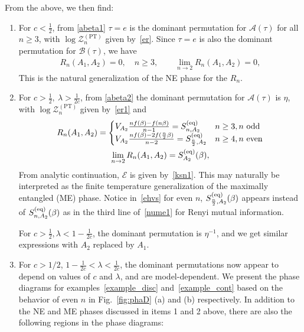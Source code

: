 \documentclass[a4paper,11pt]{article}
\newcommand\half{{\ensuremath{\frac{1}{2}}}}
\newcommand{\Zpt}{\sZ_n^{(\text{PT})}}
\newcommand{\be}{\begin{equation}}
\newcommand{\ee}{\end{equation}}
\def\b{{\beta}}
\newcommand\lam{\lambda}
\newcommand\ov{\over}
\newcommand\ha{{\half}}
\newcommand\sA{{\ensuremath{{\mathcal A}}}}
\newcommand\sB{{\ensuremath{{\mathcal B}}}}
\newcommand\sE{{\ensuremath{{\mathcal E}}}}
\newcommand\sZ{{\mathcal Z}}
\begin{document}
From the above, we then find: 
\begin{enumerate} 
\item For $c<\frac{1}{2}$, from \eqref{abeta1} $\tau=e$ is the dominant permutation for $\sA(\tau)$ for all $n\geq 3$, with $\log \Zpt$ given by~\eqref{er}. 
Since $\tau=e$ is also the dominant permutation for $\sB(\tau)$, we have 
\be\label{fin_un}
\begin{gathered} 
R_n(A_1, A_2) = 0, \quad n\geq 3, \quad \quad
\lim_{n\rightarrow 2} R_n(A_1, A_2) = 0, 
\end{gathered}
\ee
This is the natural generalization of the NE phase for the $R_n$. 

\item For $c>\ha, ~ \lambda>\frac{1}{2c}$, from \eqref{abeta2} the dominant permutation for $\sA(\tau)$ is $\eta$,
with $\log \Zpt$ given by~\eqref{er1} and
\begin{gather} 
\label{ehvs}
R_n(A_1, A_2) = \begin{cases} V_{A_2} \frac{n f(\beta)- f(n\beta)}{n-1} = S^{(\rm eq)}_{n, A_2} & n\geq 3, n \text{ odd}\\
V_{A_2} \frac{n f(\beta)- 2f(\frac{n}{2}\beta)}{n-2} = S^{(\rm eq)}_{{n \ov 2}, A_2} & n\geq 4, n \text{ even}
\end{cases} 
\\
\lim_{n\rightarrow 2} R_n(A_1, A_2) = S^{\rm (eq)}_{A_2} (\beta) ,
\end{gather} 
From analytic continuation, $\sE$ is given by~\eqref{ksn1}. 
This may naturally be interpreted as the finite temperature generalization of the maximally entangled (ME) phase. 
Notice in~\eqref{ehvs} for even $n$, $S^{(\rm eq)}_{{n \ov 2}, A_2} (\b) $ appears instead of $S^{(\rm eq)}_{n, A_2} (\b) $ as in the third line of~\eqref{nume1} for Renyi mutual information. 



For $c>\ha, \lambda< 1- \frac{1}{2c}$, the dominant permutation is $\eta^{-1}$, and we get similar expressions with $A_2$ replaced by $A_1$. 

\item For $c>1/2$, $1-\frac{1}{2c}< \lambda < \frac{1}{2c}$, the dominant permutations now appear to depend on values of $c$ and $\lam$, and are model-dependent. 
We present the phase diagrams for examples~\eqref{example_disc} and~\eqref{example_cont} based on the behavior of even $n$ in Fig.~\ref{fig:phaD} (a) and (b) respectively.
In addition to the NE and ME phases discussed in items 1 and 2 above, there are also the following regions in the phase diagrams: 


\end{enumerate}
\end{document}
